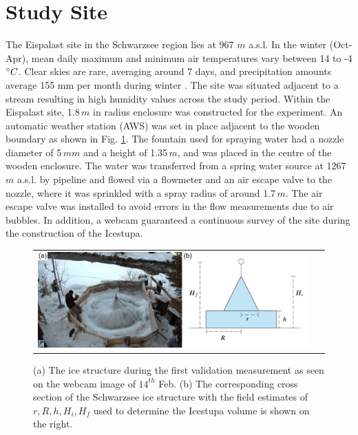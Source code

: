 \documentclass[utf8]{frontiersSCNS} %
\begin{document}
\section{Study Site}
The Eispalast site in the Schwarzsee region lies at 967 $m$ a.s.l. In the winter (Oct-Apr), mean daily maximum and
minimum air temperatures vary between 14 to -4 $\degree C$. Clear skies are rare, averaging around 7 days, and
precipitation amounts average 155 mm per month during winter \citep{eispalast}. The site was situated adjacent to a
stream resulting in high humidity values across the study period. Within the Eispalast site, 1.8\,$m$ in radius
enclosure was constructed for the experiment. An automatic weather station (AWS) was set in place adjacent to the
wooden boundary as shown in Fig. \ref{fig:site}. The fountain used for spraying water had a nozzle diameter of 5\,$mm$
and a height of 1.35\,$m$, and was placed in the centre of the wooden enclosure. The water was transferred from a
spring water source at 1267 $m$ a.s.l. by pipeline and flowed via a flowmeter and an air escape valve to the nozzle,
where it was sprinkled with a spray radius of around 1.7\,$m$. The air escape valve was installed to avoid errors in
the flow measurements due to air bubbles. In addition, a webcam guaranteed a continuous survey of the site during the
construction of the Icestupa. 

\begin{figure}[htb] \centering \begin{tabular}{@{}cc@{}} \includegraphics[width=15cm]{./Figures/Figure_2.jpg} &
\end{tabular} \caption{(a) The ice structure during the first validation measurement as seen on the webcam image of
  $14^{th}$ Feb. (b) The corresponding cross section of the Schwarzsee ice structure with the field estimates of $r, R,
  h, H_i, H_f$ used to determine the Icestupa volume is shown on the right.} \label{fig:site} \end{figure}
\end{document}
